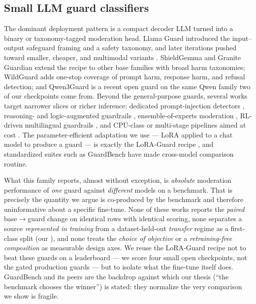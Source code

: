 \subsection{Small LLM guard classifiers}
\label{sec:related-guards}
The dominant deployment pattern is a compact decoder LLM turned into a binary or taxonomy-tagged
moderation head. Llama Guard \citep{inan2023llamaguard,llamaguard} introduced the input--output
safeguard framing and a safety taxonomy, and later iterations pushed toward smaller, cheaper, and
multimodal variants \citep{meta2024llamaguard2,meta2024llamaguard3_8b,meta2024llamaguard3_1b,%
fedorov2024llamaguard3_1b,meta2025llamaguard4}. ShieldGemma \citep{zeng2024shieldgemma} and Granite
Guardian \citep{padhi2024graniteguardian} extend the recipe to other base families with broad harm
taxonomies; WildGuard \citep{han2024wildguard,wildguard} adds one-stop coverage of prompt harm,
response harm, and refusal detection; and Qwen3Guard \citep{qwen3guard2025} is a recent open guard on
the same Qwen family two of our checkpoints come from. Beyond the general-purpose guards, several works
target narrower slices or richer inference: dedicated prompt-injection detectors
\citep{meta2024promptguard,meta2025promptguard2_86m,meta2025promptguard2_22m}, reasoning- and
logic-augmented guardrails \citep{kang2025r2guard}, ensemble-of-experts moderation
\citep{ghosh2024aegis}, RL-driven multilingual guardrails \citep{deng2025duoguard}, and CPU-class or
multi-stage pipelines aimed at cost \citep{majhi2025gpuguard}. The parameter-efficient adaptation we
use --- LoRA \citep{hu2021lora} applied to a chat model to produce a guard --- is exactly the LoRA-Guard
recipe \citep{elesedy2024loraguard}, and standardized suites such as GuardBench
\citep{bassani2024guardbench} have made cross-model comparison routine.

What this family reports, almost without exception, is \emph{absolute} moderation performance of
\emph{one} guard against \emph{different} models on a benchmark. That is precisely the quantity we argue
is co-produced by the benchmark and therefore uninformative about a specific fine-tune. None of these
works reports the \emph{paired} base$\to$guard change on identical rows with identical scoring, none
separates a source \emph{represented in training} from a dataset-held-out \emph{transfer} regime as a
first-class split (our ), and none treats the \emph{choice of objective} or a
\emph{retraining-free composition} as measurable design axes. We reuse the LoRA-Guard recipe not to beat
these guards on a leaderboard --- we score four small open checkpoints, not the gated production guards
--- but to isolate what the fine-tune itself does. GuardBench and its peers are the backdrop against
which our thesis (``the benchmark chooses the winner'') is stated: they normalize the very comparison we
show is fragile.

